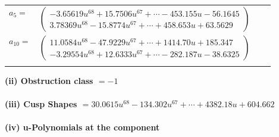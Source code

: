 \documentclass[1p]{elsarticle_modified}
\theoremstyle{definition}
\begin{document}
\begin{tabular}{m{7pt} m{180pt} m{7pt} m{180pt} }
\flushright $a_{5}=$&$\begin{pmatrix}-3.65619 u^{68}+15.7506 u^{67}+\cdots-453.155 u-56.1645\\3.78369 u^{68}-15.8774 u^{67}+\cdots+458.653 u+63.5629\end{pmatrix}$ \\
\flushright $a_{10}=$&$\begin{pmatrix}11.0584 u^{68}-47.9229 u^{67}+\cdots+1414.70 u+185.347\\-3.29554 u^{68}+12.6333 u^{67}+\cdots-282.187 u-38.6325\end{pmatrix}$\\&\end{tabular}
\flushleft \textbf{(ii) Obstruction class $= -1$}\\~\\
\flushleft \textbf{(iii) Cusp Shapes $= 30.0615 u^{68}-134.302 u^{67}+\cdots+4382.18 u+604.662$}\\~\\
\newpage\renewcommand{\arraystretch}{1}
\flushleft \textbf{(iv) u-Polynomials at the component}\newline \\
\end{document}
